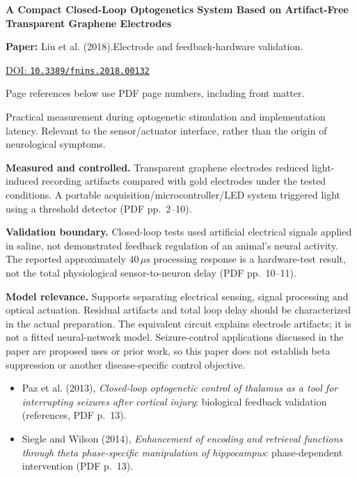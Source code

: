 

{\Large\bfseries A Compact Closed-Loop Optogenetics System Based on Artifact-Free Transparent Graphene Electrodes\par}

\textbf{Paper:} Liu et al. (2018).\quad Electrode and feedback-hardware validation.\par
\href{https://doi.org/10.3389/fnins.2018.00132}{DOI: \nolinkurl{10.3389/fnins.2018.00132}}\par
{\footnotesize Page references below use PDF page numbers, including front matter.}

Practical measurement during optogenetic stimulation and implementation latency. Relevant to the sensor/actuator interface, rather than the origin of neurological symptoms.

\textbf{Measured and controlled.} Transparent graphene electrodes reduced light-induced recording artifacts compared with gold electrodes under the tested conditions. A portable acquisition/microcontroller/LED system triggered light using a threshold detector (PDF pp.~2--10).

\textbf{Validation boundary.} Closed-loop tests used artificial electrical signals applied in saline, not demonstrated feedback regulation of an animal's neural activity. The reported approximately $40\,\mu\mathrm{s}$ processing response is a hardware-test result, not the total physiological sensor-to-neuron delay (PDF pp.~10--11).

\textbf{Model relevance.} Supports separating electrical sensing, signal processing and optical actuation. Residual artifacts and total loop delay should be characterized in the actual preparation. The equivalent circuit explains electrode artifacts; it is not a fitted neural-network model. Seizure-control applications discussed in the paper are proposed uses or prior work, so this paper does not establish beta suppression or another disease-specific control objective.

\begin{itemize}
\item Paz et al. (2013), \emph{Closed-loop optogenetic control of thalamus as a tool for interrupting seizures after cortical injury}: biological feedback validation (references, PDF p.~13).
\item Siegle and Wilson (2014), \emph{Enhancement of encoding and retrieval functions through theta phase-specific manipulation of hippocampus}: phase-dependent intervention (PDF p.~13).
\end{itemize}


